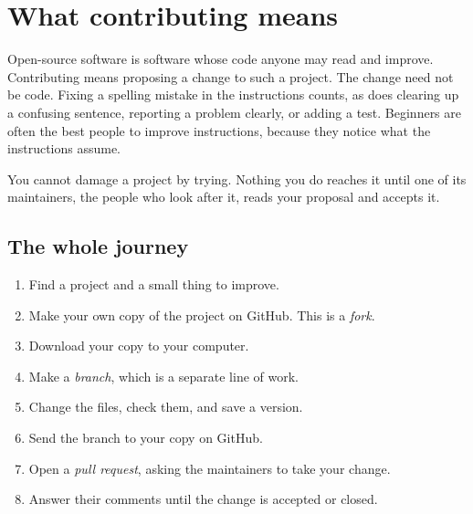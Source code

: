 \chapter{What contributing means}
\label{ch:idea}

Open-source software is software whose code anyone may read and improve. Contributing means proposing a change to such a project. The change need not be code. Fixing a spelling mistake in the instructions counts, as does clearing up a confusing sentence, reporting a problem clearly, or adding a test. Beginners are often the best people to improve instructions, because they notice what the instructions assume.

You cannot damage a project by trying. Nothing you do reaches it until one of its maintainers, the people who look after it, reads your proposal and accepts it.

\section{The whole journey}

\begin{enumerate}
\item Find a project and a small thing to improve.
\item Make your own copy of the project on GitHub. This is a \emph{fork}.
\item Download your copy to your computer.
\item Make a \emph{branch}, which is a separate line of work.
\item Change the files, check them, and save a version.
\item Send the branch to your copy on GitHub.
\item Open a \emph{pull request}, asking the maintainers to take your change.
\item Answer their comments until the change is accepted or closed.
\end{enumerate}




